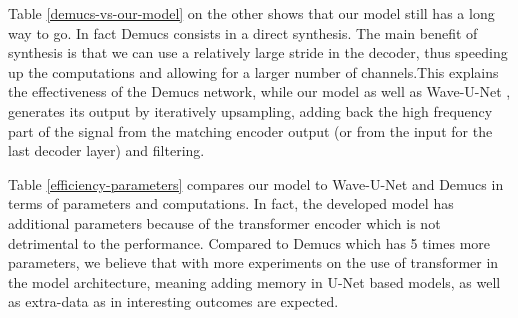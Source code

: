 \documentclass[final]{cvpr}
\begin{document}
Table \ref{demucs-vs-our-model} on the other shows that our model still has a long way to go. In fact Demucs\cite{defossez2019music} consists in a direct synthesis. The main benefit of synthesis is that we can use a relatively large stride in the decoder, thus speeding up the computations and allowing for a larger number of channels.This explains the effectiveness of the Demucs network, while our model as well as Wave-U-Net \cite{waveunet}, generates its output by iteratively upsampling, adding back the high frequency part of the signal from the matching encoder output (or from the input for the last decoder layer) and filtering.

Table \ref{efficiency-parameters} compares our model to Wave-U-Net and Demucs in terms of parameters and computations. In fact, the developed model has additional parameters because of the transformer encoder which is not detrimental to the performance. Compared to Demucs \cite{defossez2019music} which has 5 times more parameters, we believe that with more experiments on the use of transformer in the model architecture, meaning adding memory in U-Net based models, as well as extra-data as in \cite{hybrid-demucs}  interesting outcomes are expected. 
\end{document}
